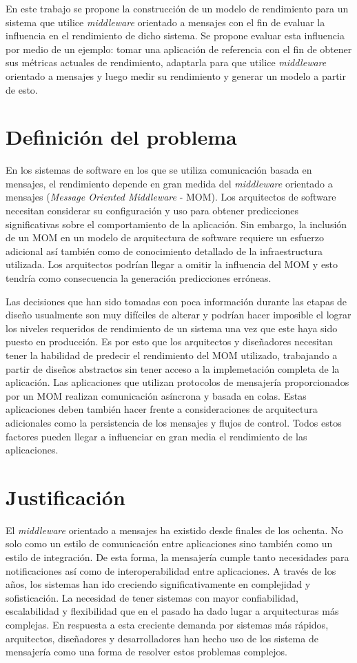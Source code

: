\documentclass[11pt, twoside]{report}
\begin{document}
En este trabajo se propone la construcción de un modelo de rendimiento para un sistema que utilice \emph{middleware} orientado a mensajes con el fin de evaluar la influencia en el rendimiento de dicho sistema. Se propone evaluar esta influencia por medio de un ejemplo: tomar una aplicación de referencia con el fin de obtener sus métricas actuales de rendimiento, adaptarla para que utilice \emph{middleware} orientado a mensajes y luego medir su rendimiento y generar un modelo a partir de esto. 


\chapter{Definición del problema}
En los sistemas de software en los que se utiliza comunicación basada en mensajes, el rendimiento depende en gran medida del \emph{middleware} orientado a mensajes (\emph{Message Oriented Middleware} - MOM). Los arquitectos de software necesitan considerar su configuración y uso para obtener predicciones significativas sobre el comportamiento de la aplicación. Sin embargo, la inclusión de un MOM en un modelo de arquitectura de software requiere un esfuerzo adicional así también como de conocimiento detallado de la infraestructura utilizada. Los arquitectos podrían llegar a omitir la influencia del MOM y esto tendría como consecuencia la generación predicciones erróneas.

Las decisiones que han sido tomadas con poca información durante las etapas de diseño usualmente son muy difíciles de alterar y podrían hacer imposible el lograr los niveles requeridos de rendimiento de un sistema una vez que este haya sido puesto en producción. Es por esto que los arquitectos y diseñadores necesitan tener la habilidad de predecir el rendimiento del MOM utilizado, trabajando a partir de diseños abstractos sin tener acceso a la implemetación completa de la aplicación. Las aplicaciones que utilizan protocolos de mensajería proporcionados por un MOM realizan comunicación asíncrona y basada en colas. Estas aplicaciones deben también hacer frente a consideraciones de arquitectura adicionales como la persistencia de los mensajes y flujos de control. Todos estos factores pueden llegar a influenciar en gran media el rendimiento de las aplicaciones.

\chapter{Justificación}
El \emph{middleware} orientado a mensajes ha existido desde finales de los ochenta\cite{activemq-in-action}. No solo como un estilo de comunicación entre aplicaciones sino también como un estilo de integración. De esta forma, la mensajería cumple tanto necesidades para notificaciones así como de interoperabilidad entre aplicaciones. A través de los años, los sistemas han ido creciendo significativamente en complejidad y sofisticación. La necesidad de tener sistemas con mayor confiabilidad, escalabilidad y flexibilidad que en el pasado ha dado lugar a arquitecturas más complejas. En respuesta a esta creciente demanda por sistemas más rápidos, arquitectos, diseñadores y desarrolladores han hecho uso de los sistema de mensajería como una forma de resolver estos problemas complejos.
\end{document}

